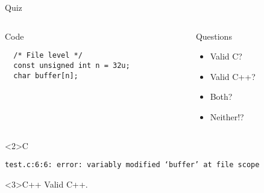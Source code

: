 \documentclass[presentation,aspectratio=169]{beamer}
\begin{document}
\begin{frame}[fragile,label={sec:org23c4234}]{Quiz}
\begin{columns}
\begin{column}{0.48\columnwidth}
\begin{block}{Code}
\begin{verbatim}
  /* File level */
  const unsigned int n = 32u;
  char buffer[n];
\end{verbatim}
\end{block}
\end{column}

\begin{column}{0.48\columnwidth}
\begin{block}{Questions}
\begin{itemize}
\item Valid C?
\item Valid C++?
\item Both?
\item Neither!?
\end{itemize}
\end{block}
\end{column}
\end{columns}

\begin{block}<2>{C}
\begin{verbatim}
test.c:6:6: error: variably modified ‘buffer’ at file scope
\end{verbatim}
\end{block}

\vspace{-1cm}
\begin{block}<3>{C++}
Valid C++.
\end{block}
\end{frame}

\end{document}
